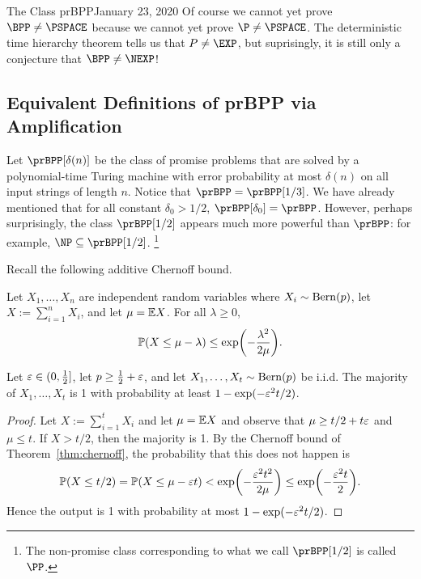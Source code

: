 \begin{lecture}{1}{The Class prBPP}{January 23, 2020}
Of course we cannot yet prove $\BPP \ne \PSPACE$ because we cannot yet prove
$\P \ne \PSPACE$. The deterministic time hierarchy theorem tells us that $P \ne
\EXP$, but suprisingly, it is still only a conjecture that $\BPP \ne \NEXP$!

\subsection{Equivalent Definitions of prBPP via Amplification}

Let $\prBPP[\delta(n)]$ be the class of promise problems that are solved by a
polynomial-time Turing machine with error probability at most $\delta(n)$ on
all input strings of length $n$. Notice that $\prBPP = \prBPP[1/3]$. We have
already mentioned that for all constant $\delta_0 > 1/2$, $\prBPP[\delta_0] =
\prBPP$. However, perhaps surprisingly, the class $\prBPP[1/2]$ appears much
more powerful than $\prBPP$: for example, $\NP \subseteq \prBPP[1/2]$.%
\footnote{The non-promise class corresponding to what we call $\prBPP[1/2]$ is
called $\PP$.}

Recall the following additive Chernoff bound.

\begin{theorem}\label{thm:chernoff}
  Let $X_1, \dots, X_n$ are independent random variables where $X_i \sim
  \operatorname{Bern}(p)$, let $X := \sum_{i=1}^n X_i$, and let $\mu = \mathbb{E} X$. For all
  $\lambda \ge 0$, \[
    \Pr\paren*{X \le \mu - \lambda} \le \exp\paren*{-\frac{\lambda^2}{2\mu}}.
  \]
\end{theorem}

\begin{proposition}\label{prop:maj}
  Let $\varepsilon \in (0, \frac{1}{2}]$, let $p \ge \frac{1}{2} + \varepsilon$, and let $X_1,
  \dots, X_t \sim \operatorname{Bern}(p)$ be i.i.d. The majority of $X_1, \dots, X_t$ is 1
  with probability at least $1 - \exp(-\varepsilon^2 t/2)$.
\end{proposition}

\begin{proof}
  Let $X := \sum_{i=1}^t X_i$ and let $\mu = \mathbb{E} X$ and observe that $\mu \ge
  t/2 + t\varepsilon$ and $\mu \le t$. If $X > t/2$, then the majority is 1. By the
  Chernoff bound of Theorem~\ref{thm:chernoff}, the probability that this does
  not happen is \[
    \Pr(X \le t/2) = \Pr(X \le \mu - \eps t) < \exp\paren*{-\frac{\eps^2t^2}{2\mu}} \le \exp\paren*{-\frac{\eps^2t}{2}}.
  \]
  Hence the output is 1 with probability at most $1 - \exp(-\varepsilon^2 t/2)$.
\end{proof}


\end{lecture}
